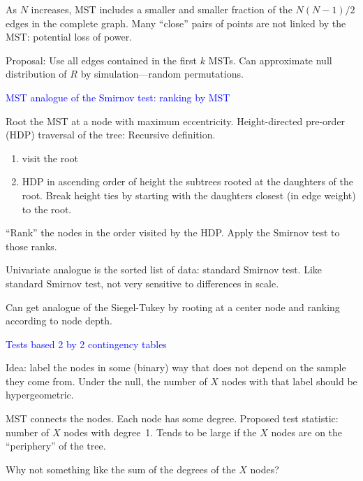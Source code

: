 \documentclass[landscape]{slides}
\begin{document}
\begin{slide}
\begin{slide}
As $N$ increases, MST includes a smaller and smaller fraction of the
$N(N-1)/2$ edges in the complete graph.
Many ``close'' pairs of points are not linked by the MST: potential
loss of power.

Proposal: Use all edges contained in the first $k$ MSTs.
Can approximate null distribution of $R$ by simulation---random
permutations.

\end{slide}


\begin{slide}
{\textcolor{blue}{MST analogue of the Smirnov test: ranking by MST}}

Root the MST at a node with maximum eccentricity.
Height-directed pre-order (HDP) traversal of the tree:
Recursive definition.
\begin{enumerate}
   \item visit the root
   \item HDP in ascending order of height the subtrees rooted at
            the daughters of the root.  Break height ties by starting with the
            daughters closest (in edge weight) to the root.
\end{enumerate}
``Rank'' the nodes in the order visited by the HDP.
Apply the Smirnov test to those ranks.

Univariate analogue is the sorted list of data: standard Smirnov test.
Like standard Smirnov test, not very sensitive to differences in scale.

Can get analogue of the Siegel-Tukey by rooting at a center node
and ranking according to node depth.


\end{slide}

\begin{slide}
{\textcolor{blue}{Tests based 2 by 2 contingency tables}}

Idea: label the nodes in some (binary) way that does not depend on
the sample they come from.
Under the null, the number of $X$ nodes with that label should
be hypergeometric.

MST connects the nodes.
Each node has some degree.
Proposed test statistic: number of $X$ nodes with degree~1.
Tends to be large if the $X$ nodes are on the ``periphery'' of the tree.

Why not something like the sum of the degrees of the $X$ nodes?


\end{slide}
\end{slide}
\end{document}

